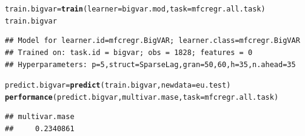 \documentclass{article}\usepackage[]{graphicx}\usepackage[]{color}
\makeatletter
\newcommand{\hlstd}[1]{\textcolor[rgb]{0.345,0.345,0.345}{#1}}%
\newcommand{\hlkwb}[1]{\textcolor[rgb]{0.69,0.353,0.396}{#1}}%
\newcommand{\hlkwc}[1]{\textcolor[rgb]{0.333,0.667,0.333}{#1}}%
\newcommand{\hlkwd}[1]{\textcolor[rgb]{0.737,0.353,0.396}{\textbf{#1}}}%
\newenvironment{kframe}{%
 \def\at@end@of@kframe{}%
 \ifinner\ifhmode%
  \def\at@end@of@kframe{\end{minipage}}%
  \begin{minipage}{\columnwidth}%
 \fi\fi%
 \def\FrameCommand##1{\hskip\@totalleftmargin \hskip-\fboxsep
 \colorbox{shadecolor}{##1}\hskip-\fboxsep
     \hskip-\linewidth \hskip-\@totalleftmargin \hskip\columnwidth}%
 \MakeFramed {\advance\hsize-\width
   \@totalleftmargin\z@ \linewidth\hsize
   \@setminipage}}%
 {\par\unskip\endMakeFramed%
 \at@end@of@kframe}
\newenvironment{knitrout}{}{} %
\theoremstyle{definition}
\makeatother
\begin{document}
\begin{knitrout}
\color{fgcolor}\begin{kframe}
\begin{alltt}
\hlstd{train.bigvar} \hlkwb{=} \hlkwd{train}\hlstd{(}\hlkwc{learner} \hlstd{= bigvar.mod,} \hlkwc{task} \hlstd{= mfcregr.all.task )}
\hlstd{train.bigvar}
\end{alltt}
\end{kframe}
\end{knitrout}

\begin{knitrout}
\color{fgcolor}\begin{kframe}
\begin{verbatim}
## Model for learner.id=mfcregr.BigVAR; learner.class=mfcregr.BigVAR
## Trained on: task.id = bigvar; obs = 1828; features = 0
## Hyperparameters: p=5,struct=SparseLag,gran=50,60,h=35,n.ahead=35
\end{verbatim}
\end{kframe}
\end{knitrout}

\begin{knitrout}
\color{fgcolor}\begin{kframe}
\begin{alltt}
\hlstd{predict.bigvar} \hlkwb{=} \hlkwd{predict}\hlstd{(train.bigvar,} \hlkwc{newdata} \hlstd{= eu.test)}
\hlkwd{performance}\hlstd{(predict.bigvar, multivar.mase,} \hlkwc{task} \hlstd{= mfcregr.all.task)}
\end{alltt}
\begin{verbatim}
## multivar.mase 
##     0.2340861
\end{verbatim}
\end{kframe}
\end{knitrout}
\end{document}
